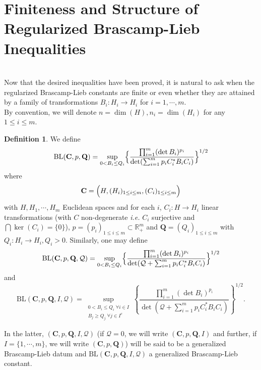 \documentclass[11pt,a4paper,reqno]{amsart}
\numberwithin{equation}{section}
\theoremstyle{definition}
\newtheorem{definition}[theorem]{Definition}
\newcommand{\<}{\ensuremath \leq}
\renewcommand{\>}{\ensuremath \geq}
\begin{document}
\section{Finiteness and Structure of Regularized Brascamp-Lieb Inequalities}

\hfill \\

Now that the desired inequalities have been proved, it is natural to ask when the regularized Brascamp-Lieb constants are finite or even whether they are attained by a family of transformations $B_i: H_i \rightarrow H_i$ for $i=1,\cdots,m.$ \hfill \\

By convention, we will denote $n=\dim(H), n_i=\dim(H_i)$ for any $1 \leq i \leq m.$



\begin{definition}
    We define $$\mathrm{BL}(\textbf{C},p,\textbf{Q})=\sup_{0<B_i \leq Q_i} \Bigl \{ \frac{\prod_{i=1}^m (\det B_i)^{p_i}}{\det(\sum_{i=1}^m p_iC_i^*B_iC_i)} \Bigl \}^{1/2}$$ where $$\textbf{C}=\Bigl (H, (H_i)_{1 \leq i \leq m},(C_i)_{1 \leq i \leq m} \Bigl)$$ with $H,H_1,\cdots,H_m$ Euclidean spaces and for each $i$, $C_i: H \rightarrow H_i$ linear transformations (with $C$ non-degenerate \textit{i.e.} $C_i$ surjective and $\bigcap \ker(C_i)=\{0\}$), $p=(p_i)_{1 \leq i \leq m} \subset \mathbb{R}_+^m$ and $\textbf{Q}=(Q_i)_{1 \leq i \leq m}$ with $Q_i: H_i \rightarrow H_i, Q_i>0.$ Similarly, one may define \begin{equation} \label{Full_LogConvex_BL_Constant} \mathrm{BL}(\textbf{C},p,\textbf{Q},\mathcal{Q})=\sup_{0<B_i \leq Q_i}\Bigl \{ \frac{\prod_{i=1}^m (\det B_i)^{p_i}}{\det(\mathcal{Q}+\sum_{i=1}^m p_iC_i^*B_iC_i)} \Bigl \}^{1/2} \end{equation} and \begin{equation} \label{Mixed_BL_Constant} \mathrm{BL}(\textbf{C},p,\textbf{Q},I,\mathcal Q)=\sup_{\substack{0<B_i \le Q_i \; \forall i \in I \\ B_j \ge Q_j \; \forall j \in I^c}}\left\{ \frac{\prod_{i=1}^m (\det B_i)^{p_i}}{\det(\mathcal Q+\sum_{i=1}^m p_iC_i^*B_iC_i)} \right\}^{1/2}.\end{equation}
\end{definition}

In the latter, $(\textbf{C},p,\textbf{Q},I,\mathcal Q)$ (if $\mathcal Q=0$, we will write $(\textbf{C},p,\textbf{Q},I)$ and further, if $I=\{1,\cdots,m\}$, we will write $(\textbf{C},p,\textbf{Q})$) will be said to be a generalized Brascamp-Lieb datum and $\mathrm{BL}(\textbf{C},p,\textbf{Q},I,\mathcal Q)$ a generalized Brascamp-Lieb constant. 
\end{document}
